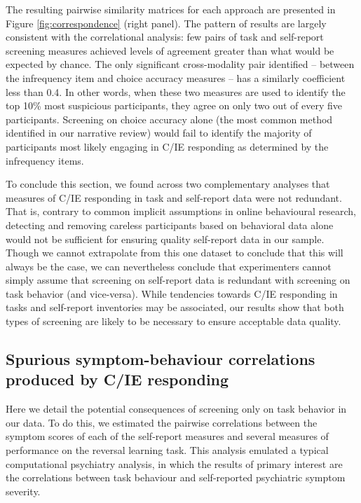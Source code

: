\documentclass[a4paper,notitlepage,12pt]{article}
\begin{document}
The resulting pairwise similarity matrices for each approach are presented in Figure \ref{fig:correspondence} (right panel). The pattern of results are largely consistent with the correlational analysis: few pairs of task and self-report screening measures achieved levels of agreement greater than what would be expected by chance. The only significant cross-modality pair identified -- between the infrequency item and choice accuracy measures -- has a similarly coefficient less than 0.4. In other words, when these two measures are used to identify the top 10\% most suspicious participants, they agree on only two out of every five participants. Screening on choice accuracy alone (the most common method identified in our narrative review) would fail to identify the majority of participants most likely engaging in C/IE responding as determined by the infrequency items.

To conclude this section, we found across two complementary analyses that measures of C/IE responding in task and self-report data were not redundant. That is, contrary to common implicit assumptions in online behavioural research, detecting and removing careless participants based on behavioral data alone would not be sufficient for ensuring quality self-report data in our sample. Though we cannot extrapolate from this one dataset to conclude that this will always be the case, we can nevertheless conclude that experimenters cannot simply assume that screening on self-report data is redundant with screening on task behavior (and vice-versa). While tendencies towards C/IE responding in tasks and self-report inventories may be associated, our results show that both types of screening are likely to be necessary to ensure acceptable data quality.

\subsection{Spurious symptom-behaviour correlations produced by C/IE responding}

Here we detail the potential consequences of screening only on task behavior in our data. To do this, we estimated the pairwise correlations between the symptom scores of each of the self-report measures and several measures of performance on the reversal learning task. This analysis emulated a typical computational psychiatry analysis, in which the results of primary interest are the correlations between task behaviour and self-reported psychiatric symptom severity.
\end{document}
